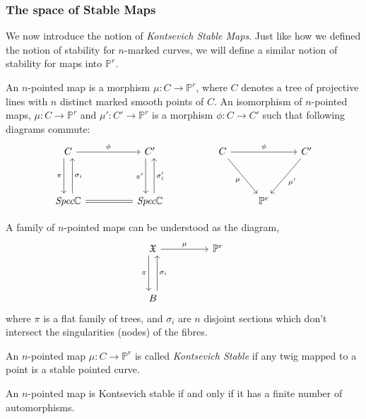 \subsubsection{The space of Stable Maps}
We now introduce the notion of \textit{Kontsevich Stable Maps}.
Just like how we defined the notion of stability for $n$-marked curves, we will define a similar notion of stability for maps into $\mathbb{P}^{r}$.
\begin{definition}
    An $n$-pointed map is a morphism $\mu : C \to \mathbb{P}^{r}$, where $C$ denotes a tree of projective lines with $n$ distinct marked smooth points of $C$.
    An isomorphism of $n$-pointed maps, $\mu : C \to \mathbb{P}^{r}$ and $\mu' : C' \to \mathbb{P}^{r}$ is a morphism $\phi : C \to C'$ such that following diagrams commute:
\[
    \begin{tikzcd}
        C & & C' & & C & & C' \\
        \\
        \emph{Spec}\mathbb{C} & & \emph{Spec}\mathbb{C} & & & \mathbb{P}^{r} & 
        \arrow["\phi", from = 1-1, to = 1-3]
        \arrow["\phi", from = 1-5, to = 1-7]
        \arrow[swap,"\mu", from = 1-5, to = 3-6]
        \arrow["\mu'", from = 1-7, to = 3-6]
        \arrow[swap,"\pi", from = 1-1, to = 3-1, xshift = -1ex]
        \arrow[swap,"\pi'", from = 1-3, to = 3-3, xshift = -1ex]
        \arrow[equal, from = 3-1, to = 3-3]
        \arrow[swap,"\sigma_{i}", from = 3-1, to = 1-1, xshift = 1ex]
        \arrow[swap,"\sigma'_{i}", from = 3-3, to = 1-3, xshift = 1ex]
    \end{tikzcd}
\]
\end{definition}
A family of $n$-pointed maps can be understood as the diagram,
\[
    \begin{tikzcd}
        \mathfrak{X} & & \mathbb{P}^{r}\\
        \\
        B & &
        \arrow["\mu", from = 1-1, to = 1-3]
        \arrow[swap, "\pi", from = 1-1, to = 3-1, xshift = -1ex]
        \arrow[swap, "\sigma_{i}", from = 3-1, to = 1-1, xshift = 1ex]
    \end{tikzcd}
\]
where $\pi$ is a flat family of trees, and $\sigma_{i}$ are $n$ disjoint sections which don't intersect the singularities (nodes) of the fibres.
\begin{definition}
    An $n$-pointed map $\mu : C \to \mathbb{P}^{r}$ is called \textit{Kontsevich Stable} if any twig mapped to a point is a stable pointed curve.
\end{definition}
\begin{lemma}
    An $n$-pointed map is Kontsevich stable if and only if it has a finite number of automorphisms.
\end{lemma}

